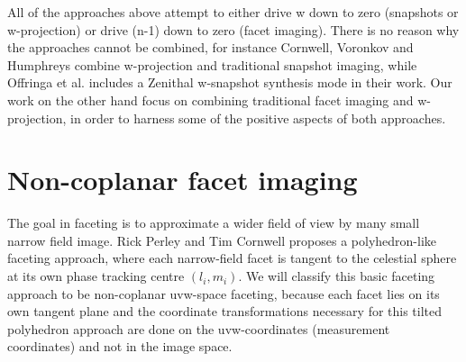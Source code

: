 All of the approaches above attempt to either drive w down to zero (snapshots or w-projection) or drive (n-1) down to zero (facet imaging). There is no reason why
the approaches cannot be combined, for instance Cornwell, Voronkov and Humphreys \cite{cornwell2012wide} combine w-projection and traditional snapshot imaging, while
Offringa et al. includes a Zenithal w-snapshot synthesis mode in their work. Our work on the other hand focus on combining traditional facet imaging and w-projection, 
in order to harness some of the positive aspects of both approaches.

\section{Non-coplanar facet imaging}
The goal in faceting is to approximate a wider field of view by many small narrow field image. Rick Perley and Tim Cornwell \cite{cornwell1992radio} proposes a 
polyhedron-like faceting approach, where each narrow-field facet is tangent to the celestial sphere at its own phase tracking centre $(l_i,m_i)$. We will classify
this basic faceting approach to be non-coplanar uvw-space faceting, because each facet lies on its own tangent plane and the coordinate transformations
necessary for this tilted polyhedron approach are done on the uvw-coordinates (measurement coordinates) and not in the image space.

